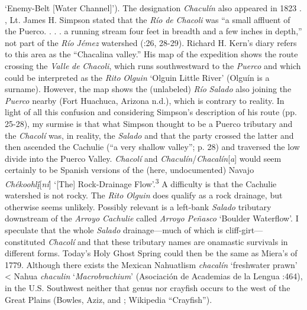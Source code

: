 ‘Enemy-Belt [Water Channel]’).  The designation \textit{Chaculín} also appeared in 1823 \citep[11]{Brugge1980}.  \citealt{In1849}, Lt. James H. Simpson stated that the \textit{Río} \textit{de} \textit{Chacoli} was “a small affluent of the Puerco. . . . a running stream four feet in breadth and a few inches in depth,” not part of the \textit{Río} \textit{Jémez} watershed (\citealt{McNitt1964}:26, 28-29).  Richard H. Kern’s diary refers to this area as the “Chacalina valley.”  His map of the expedition shows the route crossing the \textit{Valle} \textit{de} \textit{Chacoli}, which runs southwestward to the \textit{Puerco} and which could be interpreted as the \textit{Rito} \textit{Olguin} ‘Olguin Little River’ (Olguín is a surname).  However, the map shows the (unlabeled) \textit{Río} \textit{Salado} also joining the \textit{Puerco} nearby (Fort Huachuca, Arizona n.d.), which is contrary to reality.  In light of all this confusion and considering Simpson’s description of his route (pp. 25-28), my surmise is that what Simpson thought to be a Puerco tributary and the \textit{Chacolí} was, in reality, the \textit{Salado} and that the party crossed the latter and then ascended the Cachulie (“a very shallow valley”; p. 28) and traversed the low  divide into the Puerco Valley.  \textit{Chacolí} and \textit{Chaculín}/\textit{Chacalín}[\textit{a}] would seem certainly to be Spanish versions of the (here, undocumented) Navajo \textit{Chékoohl\'{\k{i}}}[\textit{ní}] ‘[The] Rock-Drainage Flow’.\textsuperscript{3}  A difficulty is that the Cachulie watershed is not rocky.  The \textit{Rito} \textit{Olguin} does qualify as a rock drainage, but otherwise seems unlikely.  Possibly relevant is a left-bank \textit{Salado} tributary downstream of the \textit{Arroyo} \textit{Cachulie} called \textit{Arroyo} \textit{Peñasco} ‘Boulder Waterflow’.  I speculate that the whole \textit{Salado} drainage—much of which is cliff-girt—constituted \textit{Chacolí} and that these tributary names are onamastic survivals in different forms.  Today’s Holy Ghost Spring could then be the same as Miera’s of 1779.  Although there exists the Mexican Nahuatlism \textit{chacalín} ‘freshwater prawn’ < Nahua \textit{chaculin} ‘\textit{Macrobrachium}’ (Asociación de Academias de la Lengua \citealt{Española2010}:464), in the U.S. Southwest neither that genus nor crayfish occurs to the west of the Great Plains (Bowles, Aziz, and \citealt{Knight2000}; Wikipedia “Crayfish”).

